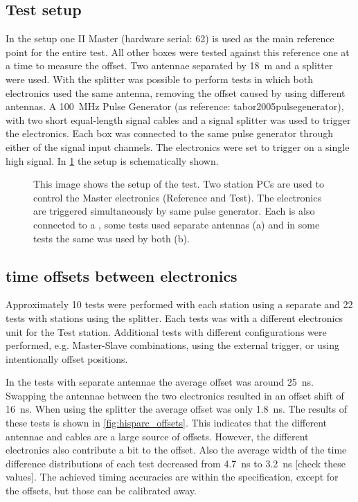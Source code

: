 \subsection{Test setup}
\label{sub:gps_test_setup}

In the setup one \hisparc II Master (hardware serial: 62) is used as the main reference point for the entire test. All other \hisparc boxes were tested against this reference one at a time to measure the offset. Two \gps antennae separated by \SI{18}{\meter} and a \gps splitter were used. With the splitter was possible to perform tests in which both \hisparc electronics used the same \gps antenna, removing the offset caused by using different \gps antennas. A \SI{100}{\mega\hertz} Pulse Generator (as reference: tabor2005pulsegenerator), with two short equal-length signal cables and a signal splitter was used to trigger the \hisparc electronics. Each box was connected to the same pulse generator through either of the signal input channels. The electronics were set to trigger on a single high signal. In \cref{fig:setup} the setup is schematically shown.

\begin{figure}
    \centering
    
    \caption{This image shows the setup of the test. Two station PCs are used to control the \hisparc Master electronics (Reference and Test). The electronics are triggered simultaneously by same pulse generator. Each is also connected to a \gps, some tests used separate \gps antennas (a) and in some tests the same \gps was used by both (b).}
    \label{fig:setup}
\end{figure}


\subsection{\gps time offsets between \hisparc electronics}
\label{sub:gps_offsets}

Approximately 10 tests were performed with each station using a separate \gps and 22 tests with stations using the \gps splitter. Each tests was with a different \hisparc electronics unit for the Test station. Additional tests with different configurations were performed, e.g. Master-Slave combinations, using the external trigger, or using intentionally offset \gps positions.

In the tests with separate \gps antennae the average offset was around \SI{25}{\ns}. Swapping the \gps antennae between the two electronics resulted in an offset shift of \SI{16}{\ns}. When using the splitter the average offset was only \SI{1.8}{\ns}. The results of these tests is shown in \cref{fig:hisparc_offsets}. This indicates that the different \gps antennae and cables are a large source of offsets. However, the different \hisparc electronics also contribute a bit to the offset. Also the average width of the time difference distributions of each test decreased from \SI{4.7}{\ns} to \SI{3.2}{\ns} [check these values]. The achieved timing accuracies are within the specification, except for the offsets, but those can be calibrated away.

